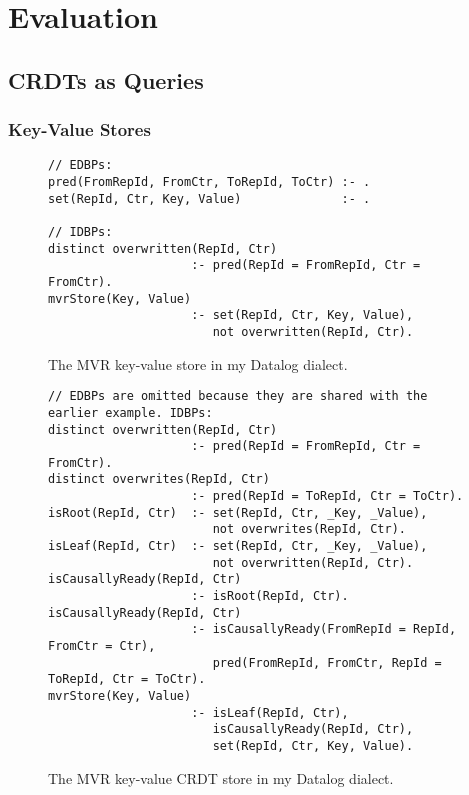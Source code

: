 
\chapter{Evaluation}\label{ch:evaluation}

\section{\acp{CRDT} as Queries}\label{sec:crdts-as-queries}

\subsection{Key-Value Stores}\label{sec:key-value-stores-datalog-dialect}

\begin{figure}[htpb]
	\begin{lstlisting}[keepspaces]
// EDBPs:
pred(FromRepId, FromCtr, ToRepId, ToCtr) :- .
set(RepId, Ctr, Key, Value)              :- .

// IDBPs:
distinct overwritten(RepId, Ctr)
                    :- pred(RepId = FromRepId, Ctr = FromCtr).
mvrStore(Key, Value)
                    :- set(RepId, Ctr, Key, Value),
                       not overwritten(RepId, Ctr).\end{lstlisting}
	\caption{The \ac{MVR} key-value store in my Datalog dialect.}\label{code:mvr-store-datalog-dialect}
\end{figure}

\begin{figure}[htpb]
	\begin{lstlisting}[keepspaces]
// EDBPs are omitted because they are shared with the earlier example. IDBPs:
distinct overwritten(RepId, Ctr)
                    :- pred(RepId = FromRepId, Ctr = FromCtr).
distinct overwrites(RepId, Ctr)
                    :- pred(RepId = ToRepId, Ctr = ToCtr).
isRoot(RepId, Ctr)  :- set(RepId, Ctr, _Key, _Value),
                       not overwrites(RepId, Ctr).
isLeaf(RepId, Ctr)  :- set(RepId, Ctr, _Key, _Value),
                       not overwritten(RepId, Ctr).
isCausallyReady(RepId, Ctr)
                    :- isRoot(RepId, Ctr).
isCausallyReady(RepId, Ctr)
                    :- isCausallyReady(FromRepId = RepId, FromCtr = Ctr),
                       pred(FromRepId, FromCtr, RepId = ToRepId, Ctr = ToCtr).
mvrStore(Key, Value)
                    :- isLeaf(RepId, Ctr),
                       isCausallyReady(RepId, Ctr),
                       set(RepId, Ctr, Key, Value).\end{lstlisting}
	\caption{The \ac{MVR} key-value \ac{CRDT} store in my Datalog dialect.}\label{code:mvr-crdt-datalog-dialect}
\end{figure}

